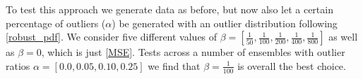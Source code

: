 \documentclass{ametsoc}
\begin{document}
To test this approach we generate data as before, but now also let a certain percentage of outliers ($\alpha$) be generated with an outlier distribution following \eqref{robust_pdf}. We consider five different values of $\beta=\left[\frac{1}{50},\frac{1}{100},\frac{1}{200},\frac{1}{400},\frac{1}{800} \right]$ as well as $\beta=0$, which is just \eqref{MSE}. Tests across a number of ensembles with outlier ratios $\alpha=\left[0.0,0.05,0.10,0.25\right]$ we find that $\beta=\frac{1}{100}$ is overall the best choice.

\end{document}
